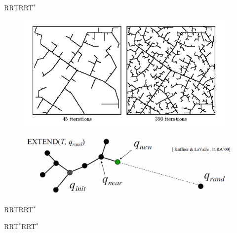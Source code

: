 \begin{frame}{RRT}{RRT$^{*}$}
	\begin{figure}
		\centering
		\includegraphics[width=.5\linewidth]{figure/RRT_graph1}
		\label{fig:rrt}
	\end{figure}
	\begin{figure}
		\centering
		\includegraphics[width=.9\linewidth]{figure/rrt_extend}
		\label{fig:rrt_extend}
	\end{figure}
\end{frame}

\begin{frame}{RRT}{RRT$^{*}$}
	
\end{frame}


\begin{frame}{RRT$^{*}$}{RRT$^{*}$}
	
\end{frame}
